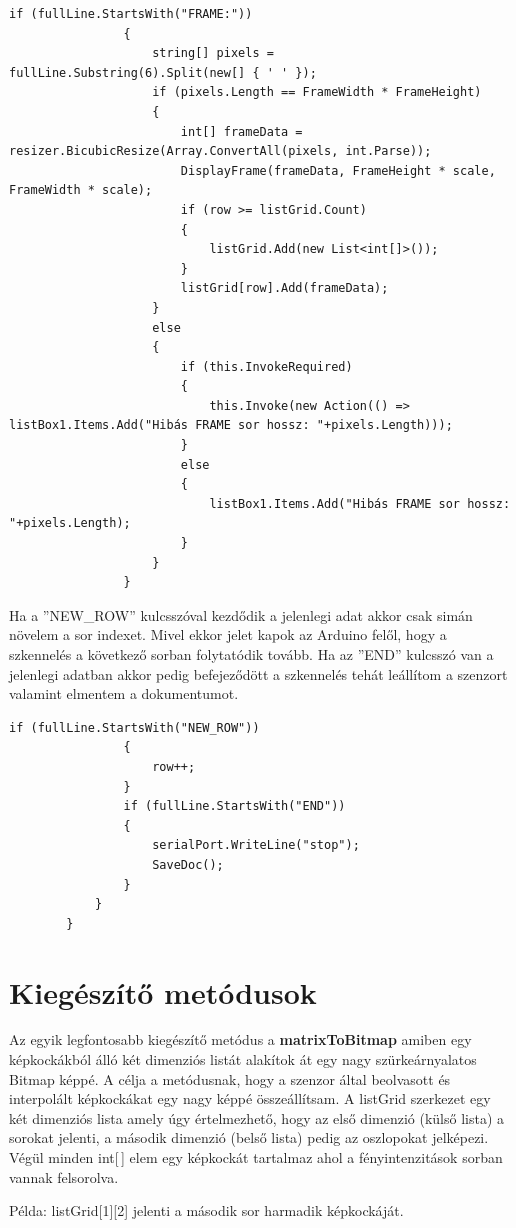 \documentclass[]{thesis-ekf}
\theoremstyle{definition}
\theoremstyle{remark}
\begin{document}
			\begin{lstlisting}[language=CSharp]
				if (fullLine.StartsWith("FRAME:"))
				{
					string[] pixels = fullLine.Substring(6).Split(new[] { ' ' });
					if (pixels.Length == FrameWidth * FrameHeight)
					{
						int[] frameData = resizer.BicubicResize(Array.ConvertAll(pixels, int.Parse));
						DisplayFrame(frameData, FrameHeight * scale, FrameWidth * scale);
						if (row >= listGrid.Count)
						{
							listGrid.Add(new List<int[]>());
						}
						listGrid[row].Add(frameData);
					}
					else
					{
						if (this.InvokeRequired)
						{
							this.Invoke(new Action(() => listBox1.Items.Add("Hibás FRAME sor hossz: "+pixels.Length)));
						}
						else
						{
							listBox1.Items.Add("Hibás FRAME sor hossz: "+pixels.Length);
						}
					}
				}
			\end{lstlisting}
			Ha a ''NEW\_ROW'' kulcsszóval kezdődik a jelenlegi adat akkor csak simán növelem a sor indexet. Mivel ekkor jelet kapok az Arduino felől, hogy a szkennelés a következő sorban folytatódik tovább. Ha az ''END'' kulcsszó van a jelenlegi adatban akkor pedig befejeződött a szkennelés tehát leállítom a szenzort valamint elmentem a dokumentumot.
			\begin{lstlisting}[language=CSharp]
				if (fullLine.StartsWith("NEW_ROW"))
				{
					row++;	
				}
				if (fullLine.StartsWith("END"))
				{
					serialPort.WriteLine("stop");
					SaveDoc();
				}
			}
		}
	\end{lstlisting}
	\section{Kiegészítő metódusok}
	Az egyik legfontosabb kiegészítő metódus a \textbf{matrixToBitmap}\cite{matrixToBitmap} amiben egy képkockákból álló két dimenziós listát alakítok át egy nagy szürkeárnyalatos Bitmap\cite{bitmap.class} képpé. A célja a metódusnak, hogy a szenzor által beolvasott és interpolált képkockákat egy nagy képpé összeállítsam. A listGrid szerkezet egy két dimenziós lista amely úgy értelmezhető, hogy az első dimenzió (külső lista) a sorokat jelenti, a második dimenzió (belső lista) pedig az oszlopokat jelképezi. Végül minden int[\,] elem egy képkockát tartalmaz ahol a fényintenzitások sorban vannak felsorolva. 
	
	Példa: listGrid[1][2] jelenti a második sor harmadik képkockáját.
	
\end{document}
